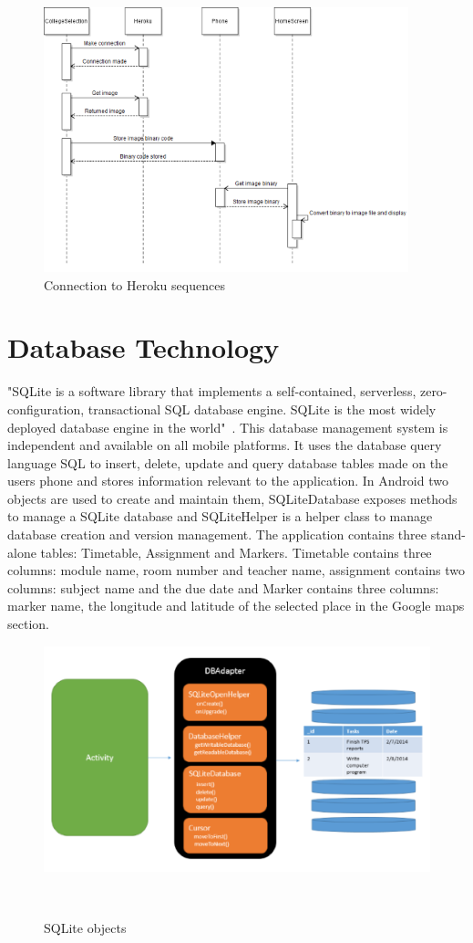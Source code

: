 \begin{figure}[!hb]
	\centering
	\includegraphics{img/heroku-connection.png}
	\caption{Connection to Heroku sequences}
\end{figure}

\clearpage
\section{Database Technology}
"SQLite is a software library that implements a self-contained, serverless, zero-configuration, transactional SQL database engine. SQLite is the most widely deployed database engine in the world"~\cite{sqlite}. This database management system is independent and available on all mobile platforms. It uses the database query language SQL to insert, delete, update and query database tables made on the users phone and stores information relevant to the application. In Android two objects are used to create and maintain them, SQLiteDatabase exposes methods to manage a SQLite database and SQLiteHelper is a helper class to manage database creation and version management. The application contains three stand-alone tables: Timetable, Assignment and Markers. Timetable contains three columns: module name, room number and teacher name, assignment contains two columns: subject name and the due date and Marker contains three columns: marker name, the longitude and latitude of the selected place in the Google maps section.\newline

\begin{figure}[h]
	\includegraphics{img/Android-SQLite-Overview.png}
	\caption{SQLite objects}~\cite{using-the-sqlite-database}
\end{figure}


